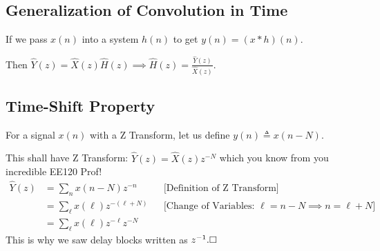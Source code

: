 \subsection{Generalization of Convolution in Time}
If we pass $x(n)$ into a system $h(n)$ to get $y(n)=(x\ast h)(n)$.

Then $\hat Y(z) = \hat X(z)\hat H(z)\implies \hat H(z)=\frac{\hat Y(z)}{\hat X(z)}$.

\subsection{Time-Shift Property}
For a signal $x(n)$ with a Z Transform, let us define $y(n)\triangleq x(n-N)$.

This shall have Z Transform: $\hat Y(z)=\hat X(z)z^{-N}$ which you know from you incredible EE120 Prof!
\begin{align*}
    \hat Y(z)
    &= \sum_{n} x(n-N) z^{-n}
    &&\text{[Definition of Z Transform]}
    \\
    &= \sum_{\ell} x(\ell) z^{-(\ell+N)}
    &&\text{[Change of Variables: $\ell=n-N\implies n=\ell+N$]}
    \\
    &= \sum_{\ell} x(\ell) z^{-\ell} z^{-N }
\end{align*}
This is why we saw delay blocks written as $z^{-1}.\hfill\square$
